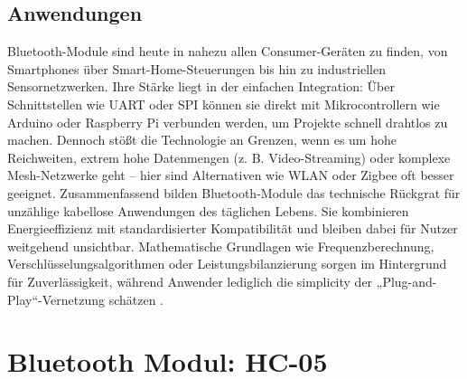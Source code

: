 \subsection{Anwendungen}

Bluetooth-Module sind heute in nahezu allen Consumer-Geräten zu finden, von Smartphones über Smart-Home-Steuerungen bis hin zu industriellen Sensornetzwerken. 
Ihre Stärke liegt in der einfachen Integration: Über Schnittstellen wie UART oder SPI können sie direkt mit Mikrocontrollern wie Arduino oder Raspberry Pi verbunden werden, um Projekte schnell drahtlos zu machen. 
Dennoch stößt die Technologie an Grenzen, wenn es um hohe Reichweiten, extrem hohe Datenmengen (z. B. Video-Streaming) oder komplexe Mesh-Netzwerke geht – hier sind Alternativen wie WLAN oder Zigbee oft besser geeignet.
Zusammenfassend bilden Bluetooth-Module das technische Rückgrat für unzählige kabellose Anwendungen des täglichen Lebens. Sie kombinieren Energieeffizienz mit standardisierter Kompatibilität und bleiben dabei für Nutzer weitgehend unsichtbar. Mathematische Grundlagen wie Frequenzberechnung, Verschlüsselungsalgorithmen oder Leistungsbilanzierung sorgen im Hintergrund für Zuverlässigkeit, während Anwender lediglich die simplicity der „Plug-and-Play“-Vernetzung schätzen \cite{Sauter:2022}.

\section{Bluetooth Modul: HC-05}


